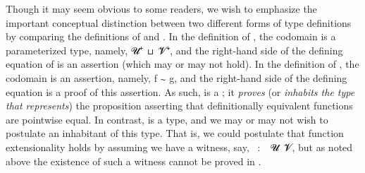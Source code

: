 Though it may seem obvious to some readers, we wish to emphasize the important conceptual distinction between two different forms of type definitions by comparing the definitions of  and . In the definition of , the codomain is a parameterized type, namely, \ab 𝓤\af ⁺~\apr ⊔~\ab 𝓥\af ⁺\af ̇, and the right-hand side of the defining equation of  is an assertion (which may or may not hold). In the definition of , the codomain is an assertion, namely, \ab f \af ∼ \ab g, and the right-hand side of the defining equation is a proof of this assertion. As such,  is a ; it \emph{proves} (or \emph{inhabits the type that represents}) the proposition asserting that definitionally equivalent functions are pointwise equal. In contrast,  is a type, and we may or may not wish to postulate an inhabitant of this type. That is, we could postulate that function extensionality holds by assuming we have a witness, say, ~\as :~~\ab 𝓤~\ab 𝓥, but as noted above the existence of such a witness cannot be proved in \mltt.

